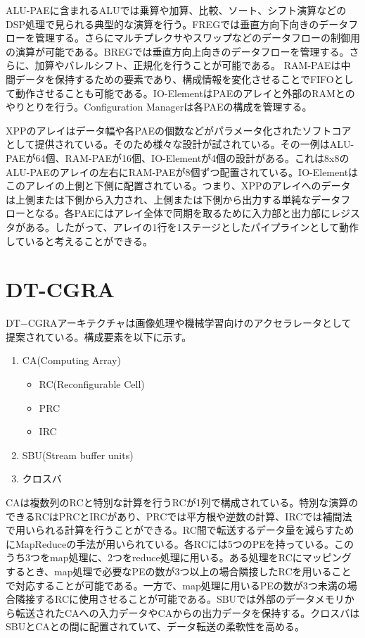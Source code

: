 {ALU-PAEに含まれるALUでは乗算や加算、比較、ソート、シフト演算などのDSP処理で見られる典型的な演算を行う。FREGでは垂直方向下向きのデータフローを管理する。さらにマルチプレクサやスワップなどのデータフローの制御用の演算が可能である。BREGでは垂直方向上向きのデータフローを管理する。さらに、加算やバレルシフト、正規化を行うことが可能である。
RAM-PAEは中間データを保持するための要素であり、構成情報を変化させることでFIFOとして動作させることも可能である。IO-ElementはPAEのアレイと外部のRAMとのやりとりを行う。Configuration Managerは各PAEの構成を管理する。

XPPのアレイはデータ幅や各PAEの個数などがパラメータ化されたソフトコアとして提供されている。そのため様々な設計が試されている。その一例はALU-PAEが64個、RAM-PAEが16個、IO-Elementが4個の設計がある。これは8x8のALU-PAEのアレイの左右にRAM-PAEが8個ずつ配置されている。IO-Elementはこのアレイの上側と下側に配置されている。つまり、XPPのアレイへのデータは上側または下側から入力され、上側または下側から出力する単純なデータフローとなる。各PAEにはアレイ全体で同期を取るために入力部と出力部にレジスタがある。したがって、アレイの1行を1ステージとしたパイプラインとして動作していると考えることができる。

\section{DT-CGRA}
\label{sec:DT-CGRA}
DT−CGRAアーキテクチャは画像処理や機械学習向けのアクセラレータとして提案されている。構成要素を以下に示す。
\begin{enumerate}
\item CA(Computing Array)
	\begin{itemize}
	\item RC(Reconfigurable Cell)
	\item PRC
	\item IRC
	\end{itemize}
\item SBU(Stream buffer units)
\item クロスバ
\end{enumerate}

CAは複数列のRCと特別な計算を行うRCが1列で構成されている。特別な演算のできるRCはPRCとIRCがあり、PRCでは平方根や逆数の計算、IRCでは補間法で用いられる計算を行うことができる。RC間で転送するデータ量を減らすためにMapReduceの手法が用いられている。各RCには5つのPEを持っている。このうち3つをmap処理に、2つをreduce処理に用いる。ある処理をRCにマッピングするとき、map処理で必要なPEの数が3つ以上の場合隣接したRCを用いることで対応することが可能である。一方で、map処理に用いるPEの数が3つ未満の場合隣接するRCに使用させることが可能である。SBUでは外部のデータメモリから転送されたCAへの入力データやCAからの出力データを保持する。クロスバはSBUとCAとの間に配置されていて、データ転送の柔軟性を高める。

}
